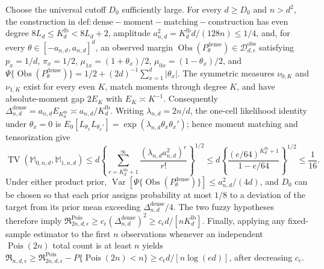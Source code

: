Choose the universal cutoff \(D_0\) sufficiently large.  For every \(d\geq D_0\) and \(n>d^2\), the construction in \(\mathrm{def:dense-moment-matching-construction}\) has even degree \(8L_d\leq K_d^{\mathrm{lb}}<8L_d+2\), amplitude \(a_{n,d}^2=K_d^{\mathrm{lb}}d/(128n)\leq1/4\), and, for every \(\theta\in[-a_{n,d},a_{n,d}]^d\), an observed margin \(\operatorname{Obs}(P_\theta^{\mathrm{dense}})\in\mathcal D_{d,\epsilon}^{\mathrm{obs}}\) satisfying \(p_x=1/d\), \(\pi_x=1/2\), \(\mu_{1x}=(1+\theta_x)/2\), \(\mu_{0x}=(1-\theta_x)/2\), and \(\Psi\{\operatorname{Obs}(P_\theta^{\mathrm{dense}})\}=1/2+(2d)^{-1}\sum_{x=1}^d\lvert\theta_x\rvert\).  The symmetric measures \(\nu_{0,K}\) and \(\nu_{1,K}\) exist for every even \(K\), match moments through degree \(K\), and have absolute-moment gap \(2E_K\) with \(E_K\asymp K^{-1}\).  Consequently \(\Delta_{n,d}^{\mathrm{dense}}=a_{n,d}E_{K_d^{\mathrm{lb}}}\asymp a_{n,d}/K_d^{\mathrm{lb}}\).  Writing \(\lambda_{n,d}=2n/d\), the one-cell likelihood identity under \(\theta_x=0\) is \(E_0[L_{\theta_x}L_{\theta_x'}]=\exp(\lambda_{n,d}\theta_x\theta_x')\); hence moment matching and tensorization give
\[
\operatorname{TV}(\mathbb M_{0,n,d},\mathbb M_{1,n,d})
\leq d\left\{\sum_{r=K_d^{\mathrm{lb}}+1}^{\infty}\frac{(\lambda_{n,d}a_{n,d}^2)^r}{r!}\right\}^{1/2}
\leq d\left\{\frac{(e/64)^{K_d^{\mathrm{lb}}+1}}{1-e/64}\right\}^{1/2}\leq\frac1{16}.
\]
Under either product prior, \(\operatorname{Var}[\Psi\{\operatorname{Obs}(P_\theta^{\mathrm{dense}})\}]\leq a_{n,d}^2/(4d)\), and \(D_0\) can be chosen so that each prior assigns probability at most \(1/8\) to a deviation of the target from its prior mean exceeding \(\Delta_{n,d}^{\mathrm{dense}}/4\).  The two fuzzy hypotheses therefore imply \(\mathfrak R^{\mathrm{Pois}}_{2n,d,\epsilon}\geq c_\epsilon(\Delta_{n,d}^{\mathrm{dense}})^2\geq c_\epsilon d/[nK_d^{\mathrm{lb}}]\).  Finally, applying any fixed-sample estimator to the first \(n\) observations whenever an independent \(\operatorname{Pois}(2n)\) total count is at least \(n\) yields \(\mathfrak R_{n,d,\epsilon}\geq\mathfrak R^{\mathrm{Pois}}_{2n,d,\epsilon}-P\{\operatorname{Pois}(2n)<n\}\geq c_\epsilon d/[n\log(ed)]\), after decreasing \(c_\epsilon\).